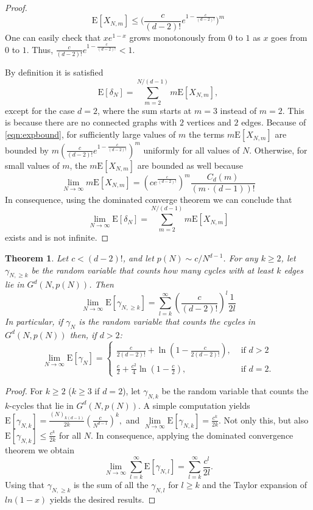 \documentclass[11pt,notitlepage,a4paper]{article}
\newtheorem{theorem}{Theorem}[section]
\theoremstyle{definition}
\newcommand{\LN}{\lim\limits_{N\to \infty}}
\begin{document}
\begin{proof}
	\begin{equation}
	\label{eqn:expbound}
		\mathrm{E}[X_{N,m}]\leq \Bigg(\frac{c}{(d-2)!}
		e^{1-\frac{c}{(d-2)!}} \Bigg)^m
	\end{equation}
	One can easily check that $xe^{1-x}$ grows monotonously from $0$
	to $1$ as $x$ goes from $0$ to $1$. Thus, $\frac{c}{(d-2)!}
	e^{1-\frac{c}{(d-2)!}}<1$.\par
	By definition it is satisfied
	\[
	\mathrm{E}[\delta_N]=\sum_{m=2}^{N/(d-1)}	m \mathrm{E}[X_{N,m}],
	\]
	except for the case $d=2$, where the sum starts at $m=3$ instead of $m=2$.
	This is because there are no connected graphs with $2$ vertices and $2$ edges. 
	Because of \cref{eqn:expbound}, for sufficiently large values of $m$ the terms
	$m\mathrm{E}[X_{N,m}]$ are bounded by
	$m(\frac{c}{(d-2)!}e^{1-\frac{c}{(d-2)!}})^m$ uniformly for all values of $N$. 
	Otherwise, for small values of $m$, the $m\mathrm{E}[X_{N,m}]$ are bounded as
	well because
	\[
	\LN m\mathrm{E}[X_{N,m}]= \left(ce^{\frac{c}{(d-2)!}}\right)^m\frac{C_d(m)}{(m\cdot(d-1))!}
	\]
	In consequence, using the dominated converge theorem we can conclude that
	\[
	\LN \mathrm{E}[\delta_N]=\sum_{m=2}^{N/(d-1)}	m \mathrm{E}[X_{N,m}]
	\]
	exists and is not infinite. 
	\end{proof}
	
	\begin{theorem}
		Let $c< (d-2)!$, and let $p(N)\sim c/N^{d-1}$. For any $k\geq 2$, let  $\gamma_{N,\geq k}$ be the random variable that counts how many 
		cycles with at least $k$ edges lie in $G^d(N,p(N))$. Then
		\[
		\LN \mathrm{E}[\gamma_{N,\geq k}]=\sum_{l=k}^{\infty} 
		\left(\frac{c}{(d-2)!}\right)^l \frac{1}{2l}
		\] 	
		In particular, if $\gamma_N$ is the random variable that counts the cycles
		in $G^d(N,p(N))$ then, if $d>2$:
		\[
		\LN \mathrm{E}[\gamma_{N}]	= 
		\begin{cases}
		\frac{c}{2(d-2)!}+ \ln\left(1-\frac{c}{2(d-2)!}\right), &  
		\text{ if } d>2\\
		\frac{c}{2}+ \frac{c^2}{4} 
		\ln\left(1-\frac{c}{2}\right), &
		\text{ if } d=2.
		\end{cases}
		\]
	\end{theorem}
	\begin{proof}
		For $k\geq 2$ ($k\geq 3$ if $d=2$), let $\gamma_{N,k}$ be the random
		variable that counts
		the $k$-cycles that lie in $G^d(N,p(N))$.
		A simple computation yields
		$
		\mathrm{E}[\gamma_{N,k}]= \frac{(N)_{k(d-1)}}{2k}
		\left(\frac{c}{N^{d-1}}\right)^k,$
		and
		$
		\LN	\mathrm{E}[\gamma_{N,k}]= \frac{c^k}{2k}
		$.
		Not only this, but also
		$
		\mathrm{E}[\gamma_{N,k}]\leq \frac{c^k}{2k}$
		for all $N$. In consequence, applying the dominated convergence
		theorem we obtain
		\[ 
		\LN \sum_{l=k}^\infty \mathrm{E}[\gamma_{N,l}]=
		 \sum_{l=k}^\infty \frac{c^l}{2l}.
		\]
		Using that $\gamma_{N,\geq k}$ is the sum of all the $\gamma_{N,l}$
		for $l\geq k$ and the Taylor expansion of $ln(1-x)$ yields the desired
		results. 
	\end{proof}
	
\end{document}
